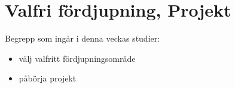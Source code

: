 \chapter{Valfri fördjupning, Projekt}\label{chapter:W12}
Begrepp som ingår i denna veckas studier:
\begin{itemize}[noitemsep,label={$\square$},leftmargin=*]
\item välj valfritt fördjupningsområde
\item påbörja projekt\end{itemize}
